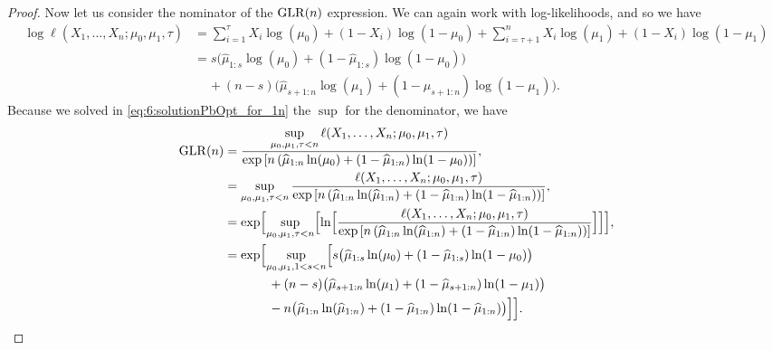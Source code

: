 \begin{proof}
    Now let us consider the nominator of the $\mathrm{GLR}(n)$ expression.
    We can again work with log-likelihoods, and so we have
    \begin{align*}
        \log\ell(X_1, \ldots, X_n ; \mu_0,\mu_1,\tau)
        &= \sum_{i=1}^{\tau} X_i \log(\mu_0) + (1-X_i) \log(1-\mu_0) + \sum_{i=\tau+1}^n X_i \log(\mu_1) + (1-X_i) \log(1-\mu_1) \\
        &= s \bigl( \widehat{\mu}_{1:s} \log(\mu_0) + (1 - \widehat{\mu}_{1:s}) \log(1-\mu_0) \bigr) \\
        & \;\;\;\; + (n-s) \bigl( \widehat{\mu}_{s+1:n} \log(\mu_1) + (1 - \widehat{\mu}_{s+1:n}) \log(1-\mu_1) \bigr).
    \end{align*}
    Because we solved in \eqref{eq:6:solutionPbOpt_for_1n} the $\sup$ for the denominator,
    we have
    \begin{align*}
        \mathrm{GLR}(n)
        &= \frac{\sup\limits_{\mu_0,\mu_1,\tau < n}\ell(X_1, \ldots, X_n ; \mu_0,\mu_1,\tau)}{ \exp\left[ n \left( \widehat{\mu}_{1:n} \ln(\mu_0) + (1 - \widehat{\mu}_{1:n}) \ln(1-\mu_0) \right) \right] }, \\
        &= \sup\limits_{\mu_0,\mu_1,\tau < n} \frac{\ell(X_1, \ldots, X_n ; \mu_0,\mu_1,\tau)}{ \exp\left[ n \left( \widehat{\mu}_{1:n} \ln(\widehat{\mu}_{1:n}) + (1 - \widehat{\mu}_{1:n}) \ln(1-\widehat{\mu}_{1:n}) \right) \right] }, \\
        &= \exp \Bigl[ \sup\limits_{\mu_0,\mu_1,\tau < n} \Bigl[ \ln\Bigl[ \frac{\ell(X_1, \ldots, X_n ; \mu_0,\mu_1,\tau)}{ \exp\left[ n \left( \widehat{\mu}_{1:n} \ln(\widehat{\mu}_{1:n}) + (1 - \widehat{\mu}_{1:n}) \ln(1-\widehat{\mu}_{1:n}) \right) \right] } \Bigr] \Bigr] \Bigr],  \\
        &= \exp \Bigl[ \sup\limits_{\mu_0,\mu_1, 1 < s < n} \Bigl[
            s \bigl( \widehat{\mu}_{1:s} \ln(\mu_0) + (1 - \widehat{\mu}_{1:s}) \ln(1-\mu_0) \bigr) \\
            & \hspace{35pt} + (n-s) \bigl( \widehat{\mu}_{s+1:n} \ln(\mu_1) + (1 - \widehat{\mu}_{s+1:n}) \ln(1-\mu_1) \bigr) \\
            & \hspace{35pt} - n \bigl( \widehat{\mu}_{1:n} \ln(\widehat{\mu}_{1:n}) + (1 - \widehat{\mu}_{1:n}) \ln(1-\widehat{\mu}_{1:n}) \bigr)
        \Bigr] \Bigr].
    \end{align*}

\end{proof}

